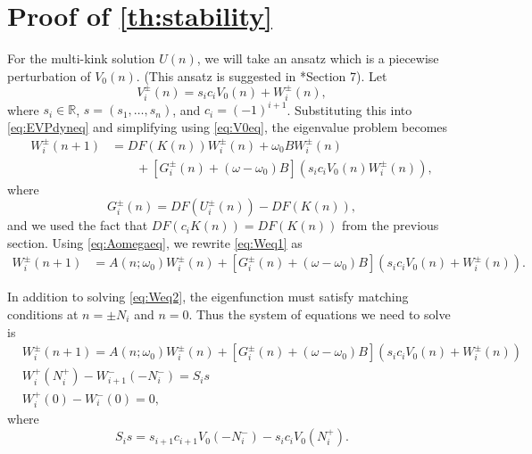 \documentclass[12pt,reqno]{amsart}
\def\R{{\mathbb R}}
\begin{document}
\section{Proof of \cref{th:stability}}\label{sec:proof2}

For the multi-kink solution $U(n)$, we will take an ansatz which is a piecewise perturbation of $V_0(n)$. (This ansatz is suggested in \cite{Sandstede1998}*{Section 7}). Let
\begin{equation}\label{eq:Viansatz}
V_i^\pm(n) = s_i c_i V_0(n) + W_i^\pm(n),
\end{equation}
where $s_i \in \R$, $s = (s_1, \dots, s_n)$, and $c_i = (-1)^{i+1}$. Substituting this into \cref{eq:EVPdyneq} and simplifying using \cref{eq:V0eq}, the eigenvalue problem becomes
\begin{equation}\label{eq:Weq1}
\begin{aligned}
W_i^\pm(n+1)
&= DF(K(n)) W_i^\pm(n) + \omega_0 B W_i^\pm(n) \\
&\qquad + [G_i^\pm(n) + (\omega - \omega_0) B](s_i c_i V_0(n) W_i^\pm(n)),
\end{aligned}
\end{equation}
where
\begin{equation}\label{eq:Gipm}
G_i^\pm(n) = DF(U_i^\pm(n)) - DF(K(n)),
\end{equation}
and we used the fact that $DF(c_i K(n)) = DF(K(n))$ from the previous section. Using \cref{eq:Aomegaeq}, we rewrite \cref{eq:Weq1} as
\begin{align}\label{eq:Weq2}
W_i^\pm(n+1)
&= A(n; \omega_0) W_i^\pm(n) + [G_i^\pm(n) + (\omega - \omega_0) B](s_i c_i V_0(n) + W_i^\pm(n)).
\end{align}

In addition to solving \cref{eq:Weq2}, the eigenfunction must satisfy matching conditions at $n = \pm N_i$ and $n = 0$. Thus the system of equations we need to solve is
\begin{equation}\label{eq:eigWsystem1}
\begin{aligned}
& W_i^\pm(n+1)
= A(n; \omega_0) W_i^\pm(n) + [G_i^\pm(n) + (\omega - \omega_0) B](s_i c_i V_0(n) + W_i^\pm(n))\\
& W_i^+(N_i^+) - W_{i+1}^-(-N_i^-) = S_i s \\
& W_i^+(0) - W_i^-(0) = 0,
\end{aligned}
\end{equation}
where
\begin{equation}\label{defDid}
S_i s = s_{i+1} c_{i+1} V_0(-N_i^-) - s_i c_i V_0(N_i^+).
\end{equation}
\end{document}

